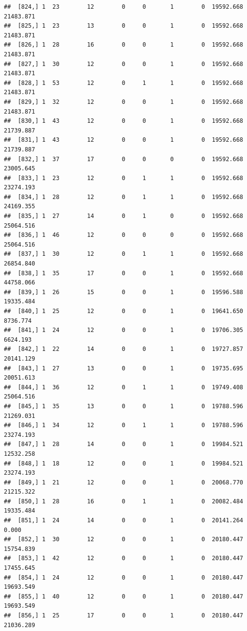 \documentclass[
]{article}
\begin{document}
\begin{verbatim}
##  [824,] 1  23        12        0     0       1        0  19592.668  21483.871
##  [825,] 1  23        13        0     0       1        0  19592.668  21483.871
##  [826,] 1  28        16        0     0       1        0  19592.668  21483.871
##  [827,] 1  30        12        0     0       1        0  19592.668  21483.871
##  [828,] 1  53        12        0     1       1        0  19592.668  21483.871
##  [829,] 1  32        12        0     0       1        0  19592.668  21483.871
##  [830,] 1  43        12        0     0       1        0  19592.668  21739.887
##  [831,] 1  43        12        0     0       1        0  19592.668  21739.887
##  [832,] 1  37        17        0     0       0        0  19592.668  23005.645
##  [833,] 1  23        12        0     1       1        0  19592.668  23274.193
##  [834,] 1  28        12        0     1       1        0  19592.668  24169.355
##  [835,] 1  27        14        0     1       0        0  19592.668  25064.516
##  [836,] 1  46        12        0     0       0        0  19592.668  25064.516
##  [837,] 1  30        12        0     1       1        0  19592.668  26854.840
##  [838,] 1  35        17        0     0       1        0  19592.668  44758.066
##  [839,] 1  26        15        0     0       1        0  19596.588  19335.484
##  [840,] 1  25        12        0     0       1        0  19641.650   8736.774
##  [841,] 1  24        12        0     0       1        0  19706.305   6624.193
##  [842,] 1  22        14        0     0       1        0  19727.857  20141.129
##  [843,] 1  27        13        0     0       1        0  19735.695  20051.613
##  [844,] 1  36        12        0     1       1        0  19749.408  25064.516
##  [845,] 1  35        13        0     0       1        0  19788.596  21269.031
##  [846,] 1  34        12        0     1       1        0  19788.596  23274.193
##  [847,] 1  28        14        0     0       1        0  19984.521  12532.258
##  [848,] 1  18        12        0     0       1        0  19984.521  23274.193
##  [849,] 1  21        12        0     0       1        0  20068.770  21215.322
##  [850,] 1  28        16        0     1       1        0  20082.484  19335.484
##  [851,] 1  24        14        0     0       1        0  20141.264      0.000
##  [852,] 1  30        12        0     0       1        0  20180.447  15754.839
##  [853,] 1  42        12        0     0       1        0  20180.447  17455.645
##  [854,] 1  24        12        0     0       1        0  20180.447  19693.549
##  [855,] 1  40        12        0     0       1        0  20180.447  19693.549
##  [856,] 1  25        17        0     0       1        0  20180.447  21036.289

\end{verbatim}
\end{document}
